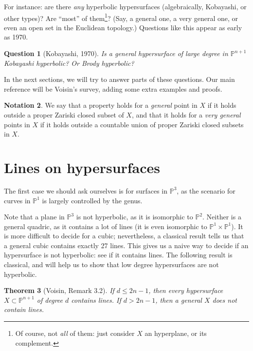 \documentclass[leqno, openany]{memoir}
\newtheorem{thm}{Theorem}[section]
\newtheorem{quest}[thm]{Question}
\theoremstyle{definition}
\newtheorem{notn}[thm]{Notation}
\theoremstyle{remark}
\theoremstyle{plain}
\theoremstyle{definition}
\theoremstyle{remark}
\renewcommand{\P}{\mathbb{P}}
\begin{document}
For instance: are there \textit{any} hyperbolic hypersurfaces (algebraically, Kobayashi, or other types)? Are ``most'' of them\footnote{Of course, not \textit{all} of them: just consider $X$ an hyperplane, or its complement.}? (Say, a general one, a very general one, or even an open set in the Euclidean topology.) Questions like this appear as early as 1970.

\begin{quest}[Kobayashi, 1970]
Is a general hypersurface of large degree in $\P^{n+1}$ Kobayashi hyperbolic? Or Brody hyperbolic?
\end{quest}

In the next sections, we will try to answer parts of these questions. Our main reference will be Voisin's survey, adding some extra examples and proofs. 

\begin{notn}
We say that a property holds for a \textit{general} point in $X$ if it holds outside a proper Zariski closed subset of $X$, and that it holds for a \textit{very general} points in $X$ if it holds outside a countable union of proper Zariski closed subsets in $X$. 
\end{notn}

\section{Lines on hypersurfaces} \label{sec:lines}

The first case we should ask ourselves is for surfaces in $\P^3$, as the scenario for curves in $\P^1$ is largely controlled by the genus.

Note that a plane in $\P^3$ is not hyperbolic, as it is isomorphic to $\P^2$. Neither is a general quadric, as it contains a lot of lines (it is even isomorphic to $\P^1 \times \P^1$). It is more difficult to decide for a cubic; nevertheless, a classical result tells us that a general cubic contains exactly 27 lines. This gives us a naive way to decide if an hypersurface is not hyperbolic: see if it contains lines. The following result is classical, and will help us to show that low degree hypersurfaces are not hyperbolic.

\begin{thm}[Voisin, Remark 3.2] \label{thm:lineshypersurfaces}
If $d \leq 2n-1$, then every hypersurface $X \subset \P^{n+1}$ of degree $d$ contains lines. If $d>2n-1$, then a general $X$ does not contain lines.
\end{thm}
\end{document}
